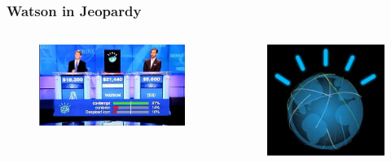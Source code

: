 \documentclass[12pt, aspectratio=169]{beamer}
\begin{document}
\begin{frame}
\frametitle{Watson in Jeopardy}
\begin{columns}[c]
\begin{figure}
  \includegraphics[width=1\linewidth]{Watson_Jeopardy.jpg}
\end{figure}
\begin{figure}
  \includegraphics[width=1\linewidth]{Watson's_avatar.jpg}
\end{figure}
\end{columns}
\end{frame}
\end{document}
